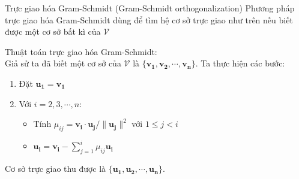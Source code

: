 \begin{frame}{Trực giao hóa Gram-Schmidt (Gram-Schmidt orthogonalization)}
    Phương pháp trực giao hóa Gram-Schmidt dùng để tìm hệ cơ sở trực giao như trên nếu biết được một cơ sở bất kì của $\mathcal{V}$
    
    Thuật toán trực giao hóa Gram-Schmidt: \\ Giả sử ta đã biết một cơ sở của $\mathcal{V}$ là $\{\bm{v_1}, \bm{v_2}, \cdots, \bm{v_n}\}$. Ta thực hiện các bước:
    \begin{enumerate}
        \item Đặt $\bm{u_1} = \bm{v_1}$
        \item Với $i=2, 3, \cdots, n$:
        \begin{itemize}
            \item Tính $\mu_{ij} = \bm{v_i} \cdot \bm{u_j} / \| \bm{u_j} \|^2$ với $1 \leq j < i$
            \item $\bm{u_i} = \bm{v_i} - \sum_{j=1}^{i}\mu_{ij} \bm{u_i}$
        \end{itemize}
    \end{enumerate}
    
    Cơ sở trực giao thu được là $\{\mathbf{u_1}, \mathbf{u_2}, \cdots, \mathbf{u_n}\}$.
\end{frame}
